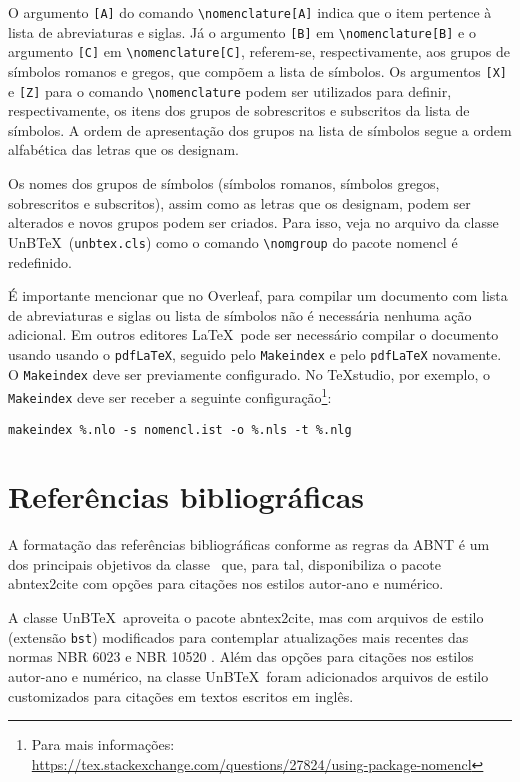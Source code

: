 O argumento \texttt{[A]} do comando \verb|\nomenclature[A]| indica que o item pertence à lista de abreviaturas e siglas. Já o argumento \texttt{[B]} em \verb|\nomenclature[B]| e o argumento \texttt{[C]} em \verb|\nomenclature[C]|, referem-se, respectivamente, aos grupos de símbolos romanos e gregos, que compõem a lista de símbolos. Os argumentos \texttt{[X]} e \texttt{[Z]} para o comando \verb|\nomenclature| podem ser utilizados para definir, respectivamente, os itens dos grupos de sobrescritos e subscritos da lista de símbolos. A ordem de apresentação dos grupos na lista de símbolos segue a ordem alfabética das letras que os designam.

Os nomes dos grupos de símbolos (símbolos romanos, símbolos gregos, sobrescritos e subscritos), assim como as letras que os designam, podem ser alterados e novos grupos podem ser criados. Para isso, veja no arquivo da classe UnB\TeX\ (\texttt{unbtex.cls}) como o comando \verb|\nomgroup| do pacote \textsf{nomencl} é redefinido.

É importante mencionar que no Overleaf, para compilar um documento com lista de abreviaturas e siglas ou lista de símbolos não é necessária nenhuma ação adicional. Em outros editores \LaTeX\ pode ser necessário compilar o documento usando usando o \texttt{pdfLaTeX}, seguido pelo \texttt{Makeindex} e pelo \texttt{pdfLaTeX} novamente. O \texttt{Makeindex} deve ser previamente configurado. No TeXstudio, por exemplo, o \texttt{Makeindex} deve ser receber a seguinte configuração\footnote{Para mais informações: \url{https://tex.stackexchange.com/questions/27824/using-package-nomencl}}:
\begin{verbatim}
makeindex %.nlo -s nomencl.ist -o %.nls -t %.nlg
\end{verbatim}

\section{Referências bibliográficas}\label{sec:referencias}

A formatação das referências bibliográficas conforme as regras da ABNT é um dos principais objetivos da classe \abnTeX\ que, para tal, disponibiliza o pacote \textsf{abntex2cite} com opções para citações nos estilos autor-ano e numérico.

A classe UnB\TeX\ aproveita o pacote \textsf{abntex2cite}, mas com arquivos de estilo (extensão \texttt{bst}) modificados para contemplar atualizações mais recentes das normas NBR 6023 \cite{NBR6023:2018} e NBR 10520 \cite{NBR10520:2023}. Além das opções para citações nos estilos autor-ano e numérico, na classe UnB\TeX\ foram adicionados arquivos de estilo customizados para citações em textos escritos em inglês.


